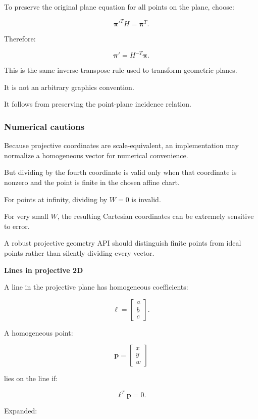 To preserve the original plane equation for all points on the plane, choose:

\[
 \boldsymbol\pi'^TH=\boldsymbol\pi^T.
\]

Therefore:

\[
 \boxed{ \boldsymbol\pi'=H^{-T}\boldsymbol\pi }.
\]

This is the same inverse-transpose rule used to transform geometric planes.

It is not an arbitrary graphics convention.

It follows from preserving the point-plane incidence relation.

\subsubsection{Numerical cautions}\label{numerical-cautions}

Because projective coordinates are scale-equivalent, an implementation may normalize a homogeneous vector for numerical convenience.

But dividing by the fourth coordinate is valid only when that coordinate is nonzero and the point is finite in the chosen affine chart.

For points at infinity, dividing by \(W=0\) is invalid.

For very small \(W\), the resulting Cartesian coordinates can be extremely sensitive to error.

A robust projective geometry API should distinguish finite points from ideal points rather than silently dividing every vector.

\textbf{Lines in projective 2D}

A line in the projective plane has homogeneous coefficients:

\[
 \boxed{ \boldsymbol\ell= \begin{bmatrix} a\\b\\c \end{bmatrix} }.
\]

A homogeneous point:

\[
 \mathbf p= \begin{bmatrix} x\\y\\w \end{bmatrix}
\]

lies on the line if:

\[
 \boxed{ \boldsymbol\ell^T\mathbf p=0 }.
\]

Expanded:

